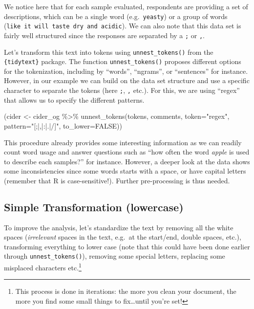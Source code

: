 \documentclass[
]{book}
\newenvironment{Shaded}{\begin{snugshade}}{\end{snugshade}}
\newcommand{\AttributeTok}[1]{\textcolor[rgb]{0.77,0.63,0.00}{#1}}
\newcommand{\ConstantTok}[1]{\textcolor[rgb]{0.00,0.00,0.00}{#1}}
\newcommand{\FunctionTok}[1]{\textcolor[rgb]{0.00,0.00,0.00}{#1}}
\newcommand{\NormalTok}[1]{#1}
\newcommand{\OtherTok}[1]{\textcolor[rgb]{0.56,0.35,0.01}{#1}}
\newcommand{\SpecialCharTok}[1]{\textcolor[rgb]{0.00,0.00,0.00}{#1}}
\newcommand{\StringTok}[1]{\textcolor[rgb]{0.31,0.60,0.02}{#1}}
\begin{document}
We notice here that for each sample evaluated, respondents are providing a set of descriptions, which can be a single word (e.g.~\texttt{yeasty}) or a group of words (\texttt{like\ it\ will\ taste\ dry\ and\ acidic}). We can also note that this data set is fairly well structured since the responses are separated by a \texttt{;} or \texttt{,}.

Let's transform this text into tokens using \texttt{unnest\_tokens()} from the \texttt{\{tidytext\}} package. The function \texttt{unnest\_tokens()} proposes different options for the tokenization, including by ``words'', ``ngrams'', or ``sentences'' for instance. However, in our example we can build on the data set structure and use a specific character to separate the tokens (here \texttt{;}, \texttt{,} etc.). For this, we are using ``regex'' that allows us to specify the different patterns.

\begin{Shaded}
\begin{Highlighting}[]
\NormalTok{(cider }\OtherTok{\textless{}{-}}\NormalTok{ cider\_og }\SpecialCharTok{\%\textgreater{}\%} 
  \FunctionTok{unnest\_tokens}\NormalTok{(tokens, comments, }\AttributeTok{token=}\StringTok{"regex"}\NormalTok{, }\AttributeTok{pattern=}\StringTok{"[;|,|:|.|/]"}\NormalTok{, }\AttributeTok{to\_lower=}\ConstantTok{FALSE}\NormalTok{))}
\end{Highlighting}
\end{Shaded}

This procedure already provides some interesting information as we can readily count word usage and answer questions such as ``how often the word \emph{apple} is used to describe each samples?'' for instance. However, a deeper look at the data shows some inconsistencies since some words starts with a space, or have capital letters (remember that R is case-sensitive!). Further pre-processing is thus needed.

\hypertarget{simple-transformation-lowercase}{%
\subsection{Simple Transformation (lowercase)}\label{simple-transformation-lowercase}}

To improve the analysis, let's standardize the text by removing all the white spaces (\emph{irrelevant} spaces in the text, e.g.~at the start/end, double spaces, etc.), transforming everything to lower case (note that this could have been done earlier through \texttt{unnest\_tokens()}), removing some special letters, replacing some misplaced characters etc.\footnote{This process is done in iterations: the more you clean your document, the more you find some small things to fix\ldots until you're set!}
\end{document}
